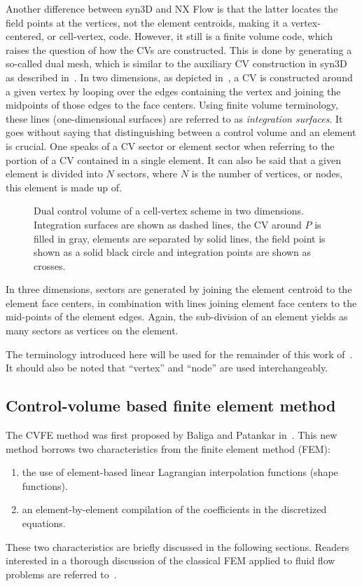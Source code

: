 Another difference between syn3D and NX Flow is that the latter locates the field points at the vertices, not the element centroids, making it a vertex-centered, or cell-vertex, code. However, it still is a finite volume code, which raises the question of how the CVs are constructed. This is done by generating a so-called dual mesh, which is similar to the auxiliary CV construction in syn3D as described in~. In two dimensions, as depicted in~, a CV is constructed around a given vertex by looping over the edges containing the vertex and joining the midpoints of those edges to the face centers. Using finite volume terminology, these lines (one-dimensional surfaces) are referred to as \textit{integration surfaces}. It goes without saying that distinguishing between a control volume and an element is crucial. One speaks of a CV sector or element sector when referring to the portion of a CV contained in a single element. It can also be said that a given element is divided into $N$ sectors, where $N$ is the number of vertices, or nodes, this element is made up of.
\begin{figure}
    \centering
    \begin{tikzpicture}[scale=3.5]
        
    \end{tikzpicture}
    \caption{Dual control volume of a cell-vertex scheme in two dimensions. Integration surfaces are shown as dashed lines, the CV around $P$ is filled in gray, elements are separated by solid lines, the field point is shown as a solid black circle and integration points are shown as crosses.}
    \label{fig:dualmeshtwo}
\end{figure}

In three dimensions, sectors are generated by joining the element centroid to the element face centers, in combination with lines joining element face centers to the mid-points of the element edges. Again, the sub-division of an element yields as many sectors as vertices on the element.

The terminology introduced here will be used for the remainder of this work of~. It should also be noted that ``vertex'' and ``node'' are used interchangeably.

\subsection{Control-volume based finite element method}
\label{sec:cvfem}
%
The CVFE method was first proposed by Baliga and Patankar in~\cite{baliga1980new,baliga1983control}. This new method borrows two characteristics from the finite element method (FEM):
\begin{enumerate}
    \item the use of element-based linear Lagrangian interpolation functions (shape functions).
    \item an element-by-element compilation of the coefficients in the discretized equations.
\end{enumerate}
These two characteristics are briefly discussed in the following sections. Readers interested in a thorough discussion of the classical FEM applied to fluid flow problems are referred to~\cite{reddy2000finite}.

